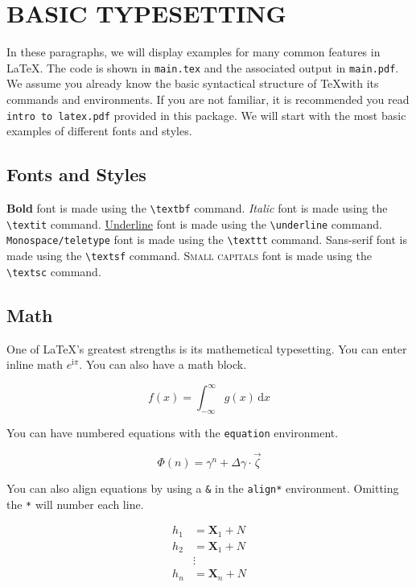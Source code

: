 \clearpage
\chapter{BASIC TYPESETTING}
\doublespacing

In these paragraphs, we will display examples for many common features in \LaTeX. The code is shown in \texttt{main.tex} and the associated output in \texttt{main.pdf}. We assume you already know the basic syntactical structure of \TeX with its commands and environments. If you are not familiar, it is recommended you read \texttt{intro to latex.pdf} provided in this package. We will start with the most basic examples of different fonts and styles.

\section*{Fonts and Styles}

\textbf{Bold} font is made using the \texttt{\textbackslash textbf} command. \textit{Italic} font is made using the \texttt{\textbackslash textit} command. \underline{Underline} font is made using the \texttt{\textbackslash underline} command. \texttt{Monospace/teletype} font is made using the \texttt{\textbackslash texttt} command. \textsf{Sans-serif} font is made using the \texttt{\textbackslash textsf} command. \textsc{Small capitals} font is made using the \texttt{\textbackslash textsc} command.

\section*{Math}

One of \LaTeX's greatest strengths is its mathemetical typesetting. You can enter inline math $e^{\mathrm{i}\pi}$. You can also have a math block.

$$
f(x) = \int _{-\infty} ^\infty g(x) \, \mathrm{d}x
$$

You can have numbered equations with the \texttt{equation} environment.

\begin{equation}
	\Phi(n) = \gamma^n + \Delta \gamma \cdot \vec{\zeta}
\end{equation}

You can also align equations by using a \texttt{\&} in the \texttt{align*} environment. Omitting the \texttt{*} will number each line.

\begin{align*}
	h_1 &= \mathbf{X}_1 + N \\
	h_2 &= \mathbf{X}_1 + N \\
	&\vdots \\
	h_n &= \mathbf{X}_n + N \\
\end{align*}

